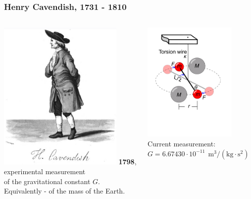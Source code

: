 \documentclass[aspectratio=169,xcolor=pdftex,dvipsnames]{beamer} %
\begin{document}
\begin{frame}
\frametitle{Henry Cavendish, 1731 - 1810}

\begin{columns}
          \includegraphics[width=60mm]{cavendish.jpg}
      \textbf{1798}, experimental measurement\\ of the gravitational constant $G$.\\
      Equivalently - of the mass of the Earth.

\includegraphics[width=45mm]{cavendishExperiment.pdf}\ \
\ \\ Current measurement: 
$ G = 6.67430 \cdot 10^{-11}\  \ \text{m}^3 / (\text{kg} \cdot \text{s}^2)$
\end{columns} 




\end{frame}
\end{document}
